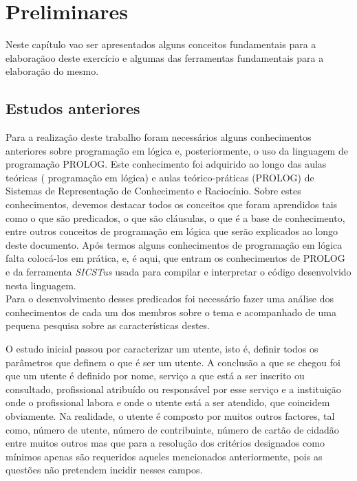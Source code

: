 \chapter{Preliminares}
\label{cap:p2}
Neste capítulo vao ser apresentados alguns conceitos fundamentais para a elaboraçãoo deste
exercício e algumas das ferramentas fundamentais para a elaboração do mesmo.


\section{Estudos anteriores}
\label{p2:estudp}

Para a realização deste trabalho foram necessários alguns conhecimentos anteriores sobre programação em lógica e, posteriormente, o uso da linguagem de programação PROLOG.
Este conhecimento foi adquirido ao longo das aulas teóricas ( programação em lógica) e aulas
teórico-práticas (PROLOG) de Sistemas de Representação de Conhecimento e Raciocínio.
Sobre estes conhecimentos, devemos destacar todos os conceitos que foram aprendidos tais
como o que são predicados, o que são cláusulas, o que é a base de conhecimento, entre outros
conceitos de programação em lógica que serão explicados ao longo deste documento.
Após termos alguns conhecimentos de programação em lógica falta colocá-los em prática,
e, é aqui, que entram os conhecimentos de PROLOG e da ferramenta \textit{SICSTus} usada para
compilar e interpretar o código desenvolvido nesta linguagem.
\\


Para o desenvolvimento desses predicados foi necessário fazer uma análise dos conhecimentos de cada um dos membros sobre o tema e acompanhado de uma pequena pesquisa sobre as características destes.

O estudo inicial passou por caracterizar um utente, isto é, definir todos os parâmetros que definem o que é ser um utente. A conclusão a que se chegou foi que um utente é definido por nome, serviço a que está a ser inscrito ou consultado, profissional atribuído ou responsável por esse serviço e a instituição onde o profissional labora e onde o utente está a ser atendido, que coincidem obviamente. Na realidade, o utente é composto por muitos outros factores, tal como, número de utente, número de contribuinte, número de cartão de cidadão entre muitos outros mas que para a resolução dos critérios designados como mínimos apenas são requeridos aqueles mencionados anteriormente, pois as questões não pretendem incidir nesses campos.
\\

